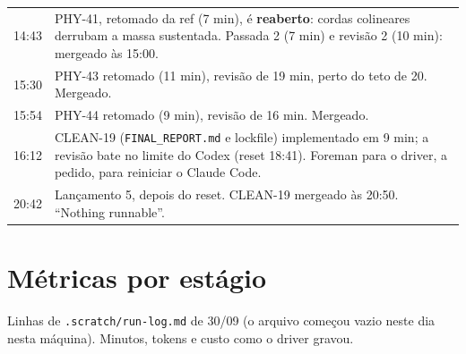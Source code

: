 \documentclass[11pt,a4paper]{article}
\begin{document}
\begin{tabularx}{\linewidth}{@{}lX@{}}
14:43 & PHY-41, retomado da ref (7 min), é \textbf{reaberto}: cordas
        colineares derrubam a massa sustentada. Passada 2 (7 min) e revisão 2
        (10 min): mergeado às 15:00.\\
15:30 & PHY-43 retomado (11 min), revisão de 19 min, perto do teto de 20.
        Mergeado.\\
15:54 & PHY-44 retomado (9 min), revisão de 16 min. Mergeado.\\
16:12 & CLEAN-19 (\texttt{FINAL\_REPORT.md} e lockfile) implementado em
        9 min; a revisão bate no limite do Codex (reset 18:41). Foreman para o
        driver, a pedido, para reiniciar o Claude Code.\\
20:42 & Lançamento 5, depois do reset. CLEAN-19 mergeado às 20:50.
        ``Nothing runnable''.\\
\bottomrule
\end{tabularx}

\section{Métricas por estágio}

Linhas de \texttt{.scratch/run-log.md} de 30/09 (o arquivo começou vazio
neste dia nesta máquina). Minutos, tokens e custo como o driver gravou.
\end{document}
